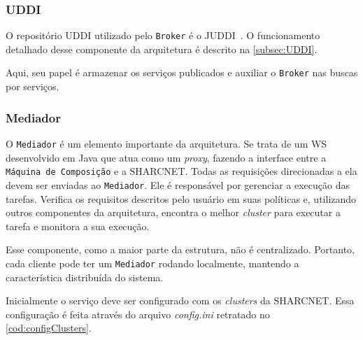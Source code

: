 \documentclass[12pt]{report} %
\begin{document}
 	    
	    
	\subsubsection{UDDI}
	O repositório UDDI utilizado pelo \texttt{Broker} é o JUDDI~\cite{JUDDI:website}.
	O funcionamento detalhado desse componente da arquitetura é descrito na \autoref{subsec:UDDI}.
	
	Aqui, seu papel é armazenar os serviços publicados e auxiliar o \texttt{Broker} nas buscas por serviços.
		
	\subsubsection{Mediador}
	\label{subsec:Mediador}
	O \texttt{Mediador} é um elemento importante da arquitetura.
	Se trata de um WS desenvolvido em Java que atua como um \textit{proxy}, fazendo a interface entre a \texttt{Máquina de Composição} e a SHARCNET.
	Todas as requisições direcionadas a ela devem ser enviadas ao \texttt{Mediador}.
	Ele é responsável por gerenciar a execução das tarefas.
	Verifica os requisitos descritos pelo usuário em suas políticas e, utilizando outros componentes da arquitetura, encontra o melhor \textit{cluster} para executar a tarefa e monitora a sua execução.
	
	Esse componente, como a maior parte da estrutura, não é centralizado.
	Portanto, cada cliente pode ter um \texttt{Mediador} rodando localmente, mantendo a característica distribuída do sistema.
	
	Inicialmente o serviço deve ser configurado com os \textit{clusters} da SHARCNET.
	Essa configuração é feita através do arquivo \textit{config.ini} retratado no \autoref{cod:configClusters}.	
	
 	    
	
\end{document}
